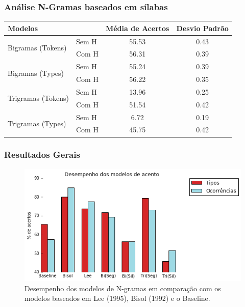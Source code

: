 \documentclass[xcolor=table]{beamer}
\begin{document}
	\begin{frame}
		\frametitle{Análise N-Gramas baseados em sílabas}
		\centering
		\label{TAB4}
		\begin{tabular}{@{}llcc@{}}
			\textbf{Modelos}                    &  & \textbf{Média de Acertos} & \textbf{Desvio Padrão} \\ \midrule
			\multirow{2}{*}{Bigramas (Tokens)}  & Sem H                        & 55.53                     & 0.43                   \\ \cmidrule(l){2-4} 
			& Com H                        & 56.31                     & 0.39                   \\ \midrule
			\multirow{2}{*}{Bigramas (Types)}   & Sem H                        & 55.24                     & 0.39                   \\ \cmidrule(l){2-4} 
			& Com H                        & 56.22                     & 0.35                   \\ \midrule
			\multirow{2}{*}{Trigramas (Tokens)} & Sem H                        & 13.96                     & 0.25                   \\ \cmidrule(l){2-4} 
			& Com H                        & 51.54                     & 0.42                   \\ \midrule
			\multirow{2}{*}{Trigramas (Types)}  & Sem H                        & 6.72                      & 0.19                   \\ \cmidrule(l){2-4} 
			& Com H                        & 45.75                     & 0.42                  
		\end{tabular}
	\end{frame}
	
	\begin{frame}
		\frametitle{Resultados Gerais}
		\begin{figure}
\centering
\includegraphics[width=0.7\linewidth]{desempenhoN-gramas-geral}
\caption{Desempenho dos modelos de N-gramas em comparação com os modelos baseados em Lee (1995), Bisol (1992) e o Baseline.}
\label{fig:desempenhoN-gramas-geral}
\end{figure}

	\end{frame}	
\end{document}
